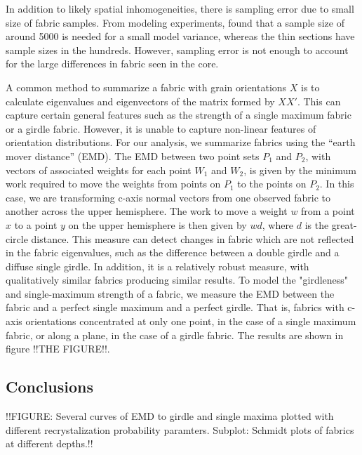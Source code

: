 \documentclass{article}
\begin{document}
 In addition to likely spatial inhomogeneities, there is sampling error due to small size of fabric samples. From modeling experiments, \citet{thorsteinsson2002nni} found that a sample size of around 5000 is needed for a small model variance, whereas the thin sections have sample sizes in the hundreds. However, sampling error is not enough to account for the large differences in fabric seen in the core.    

A common method to summarize a fabric with grain orientations $X$ is to calculate eigenvalues and eigenvectors of the matrix formed by $X X'$. This can capture certain general features such as the strength of a single maximum fabric or a girdle fabric. However, it is unable to capture non-linear features of orientation distributions. For our analysis, we summarize fabrics using the ``earth mover distance'' (EMD). The EMD between two point sets $P_1$ and $P_2$, with vectors of associated weights for each point $W_1$ and $W_2$, is given by the minimum work required to move the weights from points on $P_1$ to the points on $P_2$. In this case, we are transforming c-axis normal vectors from one observed fabric to another across the upper hemisphere. The work to move a weight $w$ from a point $x$ to a point $y$ on the upper hemisphere is then given by ${wd}$, where $d$ is the great-circle distance. This measure can detect changes in fabric which are not reflected in the fabric eigenvalues, such as the difference between a double girdle and a diffuse single girdle. In addition, it is a relatively robust measure, with qualitatively similar fabrics producing similar results. To model the "girdleness" and single-maximum strength of a fabric, we measure the EMD between the fabric and a perfect single maximum and a perfect girdle. That is, fabrics with c-axis orientations concentrated at only one point, in the case of a single maximum fabric, or along a plane, in the case of a girdle fabric. The results are shown in figure !!THE FIGURE!!. 



\subsection{Conclusions}


!!FIGURE: Several curves of EMD to girdle and single maxima plotted with different recrystalization probability paramters. Subplot: Schmidt plots of fabrics at different depths.!!
\end{document}
